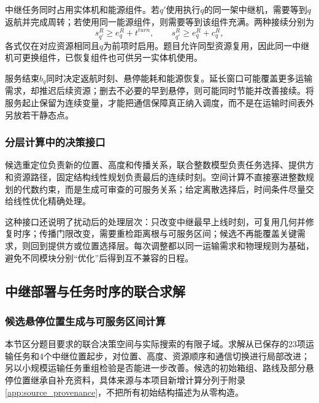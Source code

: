\documentclass[withoutpreface,colorprint]{format}
\numberwithin{equation}{section}
\numberwithin{figure}{section}
\numberwithin{table}{section}
\begin{document}
中继任务同时占用实体机和能源组件。若$q'$使用执行$q$的同一架中继机，需要等到$q$返航并完成周转；若使用同一能源组件，则需要等到该组件充满。两种接续分别为
\begin{equation}
 s_{q'}^R\ge e_q^R+t^{turn},\qquad
 s_{q'}^R\ge e_q^R+c_q^R,
 \label{eq:q3_two_relay_resources}
\end{equation}
各式仅在对应资源相同且$q$为前项时启用。题目允许同型资源复用，因此同一中继机可更换组件，已恢复组件也可供另一实体机使用。

服务结束$b_q$同时决定返航时刻、悬停能耗和能源恢复。延长窗口可能覆盖更多运输需求，却推迟后续资源；删去不必要的早到悬停，则可能同时节能并改善接续。将服务起止保留为连续变量，才能把通信保障真正纳入调度，而不是在运输时间表外另放若干静态点。

\subsubsection{分层计算中的决策接口}
候选重定位负责新的位置、高度和传播关系，联合整数模型负责任务选择、提供方和资源路径，固定结构线性规划负责最后的连续时刻。空间计算不直接塞进整数规划的代数约束，而是生成可审查的可服务关系；给定离散选择后，时间条件尽量交给线性优化精确处理。

这种接口还说明了扰动后的处理层次：只改变中继最早上线时刻，可复用几何并修复时序；传播门限改变，需要重检距离根与可服务区间；候选不再能覆盖关键需求，则回到提供方或位置选择层。每次调整都以同一运输需求和物理规则为基础，避免不同模块分别“优化”后得到互不兼容的日程。



\subsection{中继部署与任务时序的联合求解}
\subsubsection{候选悬停位置生成与可服务区间计算}
本节区分题目要求的联合决策空间与实际搜索的有限子域。求解从已保存的23项运输任务和4个中继位置起步，对位置、高度、资源顺序和通信切换进行局部改进；另以小规模运输任务重组检验是否能进一步改善。候选的初始箱组、路线及部分悬停位置继承自补充资料，具体来源与本项目新增计算分列于附录\ref{app:source_provenance}，不把所有初始结构描述为从零构造。
\end{document}
